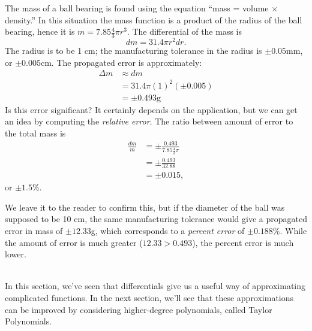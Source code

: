 {The mass of a ball bearing is found using the equation ``mass = volume $\times$ density.'' In this situation the mass function is a product of the radius of the ball bearing, hence it is $m = 7.85\frac43\pi r^3$. The differential of the mass is 
\[
dm = 31.4\pi r^2 dr.
\]
 The radius is to be 1 cm; the manufacturing tolerance in the radius is $\pm 0.05$mm, or $\pm 0.005$cm. The propagated error is approximately:
\begin{align*}
\Delta m & \approx dm \\
				&= 31.4\pi (1)^2 (\pm 0.005) \\
				&= \pm 0.493\text{g}
\end{align*}
Is this error significant? It certainly depends on the application, but we can get an idea by computing the \textit{relative error}. The ratio between amount of error to the total mass is
\begin{align*}
\frac{dm}{m} &= \pm \frac{0.493}{7.85\frac43\pi} \\
							&=\pm \frac{0.493}{32.88}\\
							&=\pm 0.015,
\end{align*}
or $\pm 1.5$\%. 

\enlargethispage{\baselineskip}

We leave it to the reader to confirm this, but if the diameter of the ball was supposed to be 10 cm, the same manufacturing tolerance would give a propagated error in mass of $\pm12.33$g, which corresponds to a \textit{percent error} of $\pm0.188$\%. While the amount of error is much greater ($12.33 > 0.493$), the percent error is much lower.
}\\

In this section, we've seen that differentials give us a useful way of approximating complicated functions. In the next section, we'll see that these approximations can be improved by considering higher-degree polynomials, called Taylor Polynomials.


